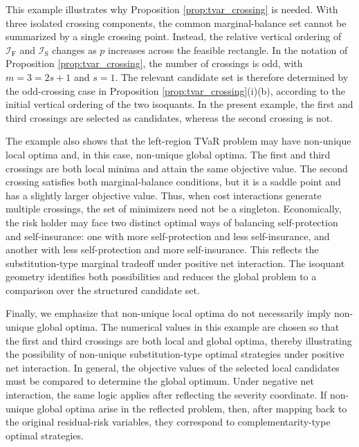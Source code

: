 \documentclass[a4paper,12pt]{article}
\begin{document}
This example illustrates why Proposition \ref{prop:tvar_crossing} is needed. With three isolated crossing components, the common marginal-balance set cannot be summarized by a single crossing point. Instead, the relative vertical ordering of \(\mathcal I_{\mathrm F}\) and \(\mathcal I_{\mathrm S}\) changes as $p$ increases across the feasible rectangle. In the notation of Proposition \ref{prop:tvar_crossing}, the number of crossings is odd, with \(m=3=2s+1\) and \(s=1\). The relevant candidate set is therefore determined by the odd-crossing case in Proposition \ref{prop:tvar_crossing}(i)(b), according to the initial vertical ordering of the two isoquants. In the present example, the first and third crossings are selected as candidates, whereas the second crossing is not.

The example also shows that the left-region TVaR problem may have non-unique local optima and, in this case, non-unique global optima. The first and third crossings are both local minima and attain the same objective value. The second crossing satisfies both marginal-balance conditions, but it is a saddle point and has a slightly larger objective value. Thus, when cost interactions generate multiple crossings, the set of minimizers need not be a singleton. Economically, the risk holder may face two distinct optimal ways of balancing self-protection and self-insurance: one with more self-protection and less self-insurance, and another with less self-protection and more self-insurance. This reflects the substitution-type marginal tradeoff under positive net interaction. The isoquant geometry identifies both possibilities and reduces the global problem to a comparison over the structured candidate set.

Finally, we emphasize that non-unique local optima do not necessarily imply non-unique global optima. The numerical values in this example are chosen so that the first and third crossings are both local and global optima, thereby illustrating the possibility of non-unique substitution-type optimal strategies under positive net interaction. In general, the objective values of the selected local candidates must be compared to determine the global optimum. Under negative net interaction, the same logic applies after reflecting the severity coordinate. If non-unique global optima arise in the reflected problem, then, after mapping back to the original residual-risk variables, they correspond to complementarity-type optimal strategies.

\end{document}
